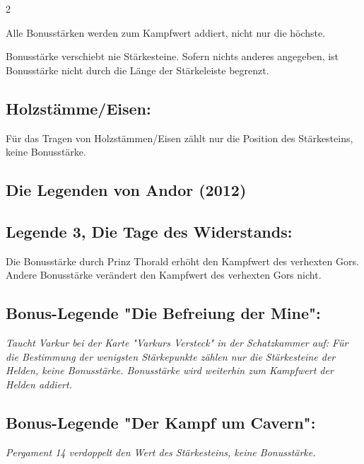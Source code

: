 \documentclass[10pt, a4paper, oneside]{book}
\newcommand{\fan}[1]{\textit{#1}}
\begin{document}
\begin{multicols*}{2}
\begin{nobgcolor}
Alle Bonusstärken werden zum Kampfwert addiert, nicht nur die höchste.

Bonusstärke verschiebt nie Stärkesteine. Sofern nichts anderes angegeben, ist Bonusstärke nicht durch die Länge der Stärkeleiste begrenzt.



\subsection{Holzstämme/Eisen:}

Für das Tragen von Holzstämmen/Eisen zählt nur die Position des Stärkesteins, keine Bonusstärke.
\supercite{dridn-begleitheft,dlh-begleitheft,ag-begleitheft,dfl-begleitheft}


\end{nobgcolor}



\begin{bgcolor}
\section{Die Legenden von Andor (2012)}


\subsection{Legende 3, Die Tage des Widerstands:}

Die Bonusstärke durch Prinz Thorald erhöht den Kampfwert des verhexten Gors. 
\supercite{dlva3-der-verhexte-gor}
Andere Bonusstärke verändert den Kampfwert des verhexten Gors nicht.
\supercite{155,3450}


\subsection{Bonus-Legende "Die Befreiung der Mine":}

\fan{Taucht Varkur bei der Karte "Varkurs Versteck" in der Schatzkammer auf: Für die Bestimmung der wenigsten Stärkepunkte zählen nur die Stärkesteine der Helden, keine Bonusstärke. Bonusstärke wird weiterhin zum Kampfwert der Helden addiert.}


\subsection{Bonus-Legende "Der Kampf um Cavern":}

\fan{Pergament 14 verdoppelt den Wert des Stärkesteins, keine Bonusstärke.}


\end{bgcolor}
\end{multicols*}
\end{document}

